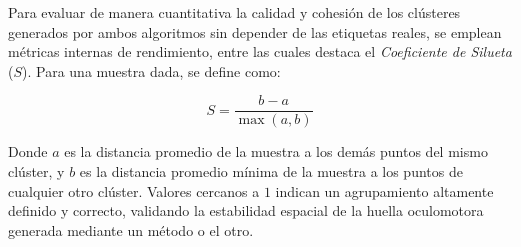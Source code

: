 Para evaluar de manera cuantitativa la calidad y cohesión de los clústeres generados por ambos algoritmos sin depender de las etiquetas reales, se emplean métricas internas de rendimiento, entre las cuales destaca el \textit{Coeficiente de Silueta} ($S$). Para una muestra dada, se define como:

\begin{equation}
	S = \frac{b - a}{\max(a, b)}
\end{equation}

Donde $a$ es la distancia promedio de la muestra a los demás puntos del mismo clúster, y $b$ es la distancia promedio mínima de la muestra a los puntos de cualquier otro clúster. Valores cercanos a $1$ indican un agrupamiento altamente definido y correcto, validando la estabilidad espacial de la huella oculomotora generada mediante un método o el otro.